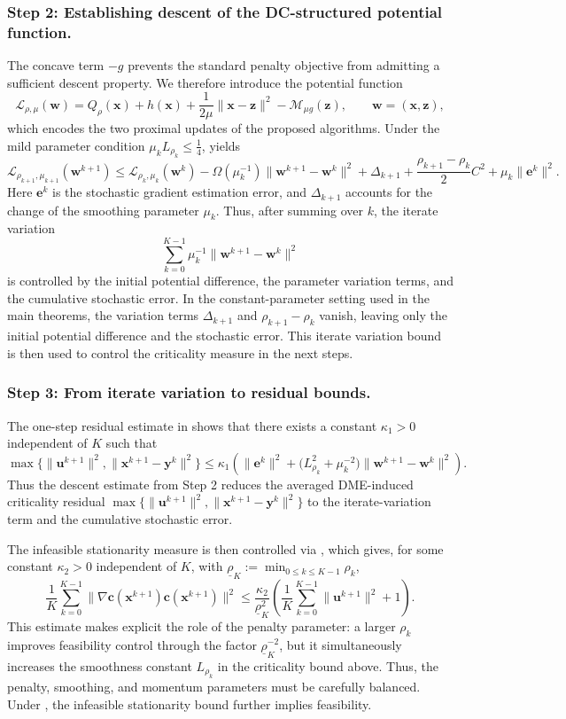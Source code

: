 \documentclass{article}
\theoremstyle{plain}
\theoremstyle{definition}
\theoremstyle{remark}
\newcommand{\bx}{\bm{x}}
\newcommand{\bc}{\bm{c}}
\newcommand{\be}{\bm{e}}
\newcommand{\bu}{\bm{u}}
\newcommand{\bz}{\bm{z}}
\newcommand{\by}{\bm{y}}
\newcommand{\calL}{\mathcal{L}}
\newcommand{\calM}{\mathcal{M}}
\newcommand{\bw}{\bm{w}}
\numberwithin{equation}{section}
\begin{document}
\subsubsection*{Step 2: Establishing descent of the DC-structured potential function.}
The concave term \(-g\) prevents the standard penalty objective from admitting a sufficient descent property. We therefore introduce the potential function
\[
\calL_{\rho,\mu}(\bw) = Q_\rho(\bx)+h(\bx)+\frac{1}{2\mu}\|\bx-\bz\|^2-\calM_{\mu g}(\bz), \qquad \bw=(\bx,\bz),
\]
which encodes the two proximal updates of the proposed algorithms. Under the mild parameter condition \(\mu_k L_{\rho_k}\le \tfrac{1}{4}\),  yields
\[
\calL_{\rho_{k+1},\mu_{k+1}}(\bw^{k+1}) \le \calL_{\rho_k,\mu_k}(\bw^k) -\Omega(\mu_k^{-1})\|\bw^{k+1}-\bw^k\|^2 +\Delta_{k+1} +\frac{\rho_{k+1}-\rho_k}{2}C^2 +\mu_k\|\be^k\|^2 .
\]
Here \(\be^k\) is the stochastic gradient estimation error, and \(\Delta_{k+1}\) accounts for the change of the smoothing parameter \(\mu_k\). Thus, after summing over \(k\), the iterate variation
\[
    \sum_{k=0}^{K-1} \mu_k^{-1}\|\bw^{k+1}-\bw^k\|^2
\]
is controlled by the initial potential difference, the parameter variation terms, and the cumulative stochastic error. In the constant-parameter setting used in the main theorems, the variation terms \(\Delta_{k+1}\) and \(\rho_{k+1}-\rho_k\) vanish, leaving only the initial potential difference and the stochastic error. This iterate variation bound is then used to control the criticality measure in the next steps.

\subsubsection*{Step 3: From iterate variation to residual bounds.}
The one-step residual estimate in  shows that there exists a constant $\kappa_1>0$ independent of $K$ such that
\[
\max\{\|\bu^{k+1}\|^2,\|\bx^{k+1}-\by^k\|^2\} \leq \kappa_1\left(\|\be^k\|^2 + \bigl(L_{\rho_k}^2+\mu_k^{-2}\bigr) \|\bw^{k+1}-\bw^k\|^2\right).
\]
Thus the descent estimate from Step 2 reduces the averaged DME-induced criticality residual
$\max\{\|\bu^{k+1}\|^2,\|\bx^{k+1}-\by^k\|^2\}$
to the iterate-variation term and the cumulative stochastic error.

The infeasible stationarity measure is then controlled via , which gives, for some constant $\kappa_2>0$ independent of $K$, with \(\underline{\rho}_K:=\min_{0\leq k\leq K-1}\rho_k\),
\[
\frac{1}{K}\sum_{k=0}^{K-1} \|\nabla \bc(\bx^{k+1})\bc(\bx^{k+1})\|^2 \leq \frac{\kappa_2}{\underline{\rho}_K^2} \left( \frac{1}{K}\sum_{k=0}^{K-1}\|\bu^{k+1}\|^2 +1 \right).
\]
This estimate makes explicit the role of the penalty parameter: a larger \(\rho_k\) improves feasibility control through the factor \(\underline{\rho}_K^{-2}\), but it simultaneously increases the smoothness constant \(L_{\rho_k}\) in the criticality bound above. Thus, the penalty, smoothing, and momentum parameters must be carefully balanced. Under , the infeasible stationarity bound further implies feasibility.
\end{document}
